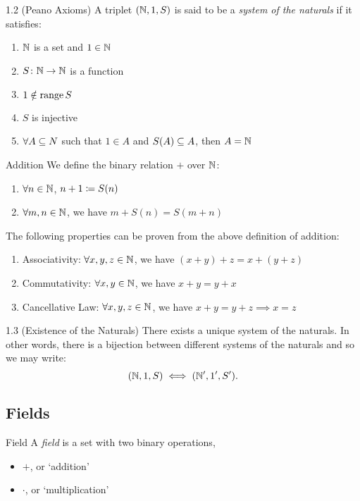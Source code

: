 \documentclass[class=article, crop=false]{standalone}
\begin{document}
  \begin{definition}{1.2 (Peano Axioms)}
    A triplet $(\mathbb{N}, 1, S)$ is said to be a \emph{system of the naturals} if it satisfies:
    \begin{enumerate}[label=\arabic*)]
      \item $\mathbb{N}$ is a set and $1\in\mathbb{N}$
      \item $S\colon \mathbb{N}\to \mathbb{N}$ is a function
      \item $1\notin \operatorname{range} S$
      \item $S$ is injective
      \item $\forall A\subseteq N$ such that $1\in A$ and $S(A)\subseteq A$, then $A = \mathbb{N}$
    \end{enumerate}
  \end{definition}
  \begin{definition}{Addition}
    We define the binary relation $+$ over $\mathbb{N}$:
    \begin{enumerate}[label=(\roman*)]
      \item $\forall n\in\mathbb{N}$, $n + 1\coloneqq S(n)$
      \item $\forall m, n\in \mathbb{N}$, we have $m + S(n) = S(m + n)$
    \end{enumerate}
  \end{definition}
  The following properties can be proven from the above definition of addition:
  \begin{enumerate}[label=(\alph*)]
    \item Associativity: $\forall x,y,z\in \mathbb{N}$, we have $(x + y) + z = x + (y + z)$
    \item Commutativity: $\forall x,y\in \mathbb{N}$, we have $x + y = y + x$
    \item Cancellative Law: $\forall x, y, z\in \mathbb{N}$, we have $x + y = y + z\implies x = z$
  \end{enumerate}
  \begin{theorem}{1.3 (Existence of the Naturals)}
    There exists a unique system of the naturals. In other words, there is a bijection between different systems of the naturals and so we may write:
    \[
      (\mathbb{N}, 1, S) \iff (\mathbb{N}', 1', S').
    \]
  \end{theorem}


  \subsection{Fields}
  \begin{definition}{Field}
    A \emph{field} is a set with two binary operations,
    \begin{itemize}
      \item $+$, or `addition'
      \item $\cdot$, or `multiplication'
    \end{itemize}
  \end{definition}
\end{document}
